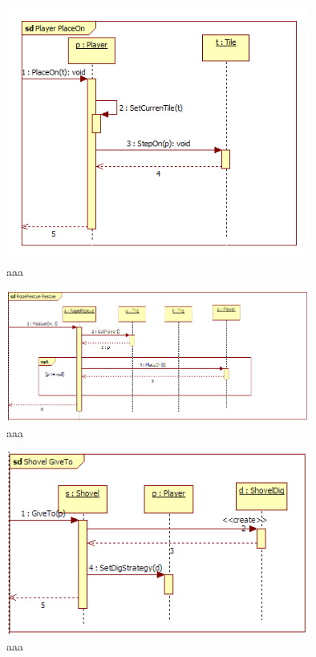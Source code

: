 \begin{figure}[H]
	\begin{center}
		\includegraphics[width=10cm]{chapters/chapter03/seqdiag/Player_PlaceOn.png}
		\caption{aaa}
		\label{bbb}
	\end{center}
\end{figure}
\begin{figure}[H]
	\begin{center}
		\includegraphics[width=10cm]{chapters/chapter03/seqdiag/RopeRescue_Rescue.png}
		\caption{aaa}
		\label{bbb}
	\end{center}
\end{figure}
\begin{figure}[H]
	\begin{center}
		\includegraphics[width=10cm]{chapters/chapter03/seqdiag/Shovel_GiveTo.png}
		\caption{aaa}
		\label{bbb}
	\end{center}
\end{figure}
